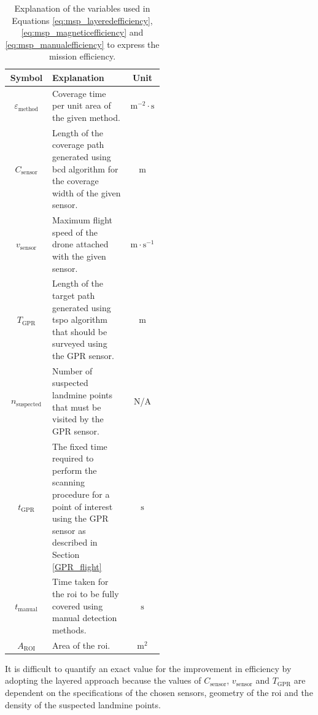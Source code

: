 \begin{table}[h!]
    \centering
    \begin{tabular}{|c|p{0.5\linewidth}|c|}
    \hline
        \textbf{Symbol} & \textbf{Explanation} & \textbf{Unit} \\
    \hline\hline
        $\varepsilon_{\mathrm{method}}$ & Coverage time per unit area of the given method. & $\mathrm{m}^{-2} \cdot \mathrm{s}$ \\
    \hline
        $C_{\mathrm{sensor}}$ & Length of the coverage path generated using \gls{bcd} algorithm for the coverage width of the given sensor.  & $\mathrm{m}$ \\
    \hline
        $v_{\mathrm{sensor}}$ & Maximum flight speed of the drone attached with the given sensor. & $\mathrm{m} \cdot \mathrm{s}^{-1}$ \\
    \hline
        $T_{\mathrm{GPR}}$ & Length of the target path generated using \gls{tspo} algorithm that should be surveyed using the \gls{GPR} sensor. & $\mathrm{m}$ \\
    \hline
        $n_{\mathrm{suspected}}$ & Number of suspected landmine points that must be visited by the \gls{GPR} sensor. & N/A \\
    \hline
        $t_{\mathrm{GPR}}$ & The fixed time required to perform the scanning procedure for a point of interest using the \gls{GPR} sensor as described in Section \ref{GPR_flight} & $\mathrm{s}$ \\
    \hline
        $t_{\mathrm{manual}}$ & Time taken for the \gls{roi} to be fully covered using manual detection methods. & $\mathrm{s}$ \\
    \hline
        $A_{\mathrm{ROI}}$ & Area of the \gls{roi}. & $\mathrm{m}^{2}$ \\
    \hline
    \end{tabular}
    \caption[Explanation of Variables for Mission Efficiency Expressions]
    {Explanation of the variables used in Equations \ref{eq:msp_layeredefficiency}, \ref{eq:msp_magneticefficiency} and \ref{eq:msp_manualefficiency} to express the mission efficiency.}
    \label{tab:msp_efficiencyvariables}
\end{table}

It is difficult to quantify an exact value for the improvement in efficiency by adopting the layered approach because the values of $C_{\mathrm{sensor}}$, $v_{\mathrm{sensor}}$ and $T_{\mathrm{GPR}}$ are dependent on the specifications of the chosen sensors, geometry of the \gls{roi} and the density of the suspected landmine points. 

